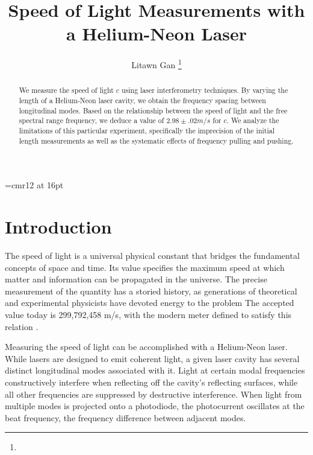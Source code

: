 \documentclass[journal, a4paper]{IEEEtran}
\begin{document}

\font\myfont=cmr12 at 16pt

	\title{\myfont  Speed of Light Measurements with a Helium-Neon Laser }
	\author{Litawn Gan
	\thanks{}}
	\maketitle
    
\begin{abstract}
We measure the speed of light $c$ using laser interferometry techniques. By varying the length of a Helium-Neon laser cavity, we obtain the frequency spacing between longitudinal modes. Based on the relationship between the speed of light and the free spectral range frequency, we deduce a value of $2.98 \pm .02 m/s$ for $c$. We analyze the limitations of this particular experiment, specifically the imprecision of the initial length measurements as well as the systematic effects of frequency pulling and pushing.
\end{abstract}

\section{Introduction}

The speed of light is a universal physical constant that bridges the fundamental concepts of space and time. Its value specifies the maximum speed at which matter and information can be propagated in the universe. The precise measurement of the quantity has a storied history, as generations of theoretical and experimental physicists have devoted energy to the problem \cite{measure}  The accepted value today is 299,792,458 m/s, with the modern meter defined to satisfy this relation \cite{speed}.

Measuring the speed of light can be accomplished with a Helium-Neon laser. While lasers are designed to emit coherent light, a given laser cavity has several distinct longitudinal modes associated with it. Light at certain  modal frequencies constructively interfere when reflecting off the cavity's reflecting surfaces, while all other frequencies are suppressed by destructive interference.  When light from multiple modes is projected onto a photodiode, the photocurrent oscillates at the beat frequency, the frequency difference between adjacent modes.
\end{document}
